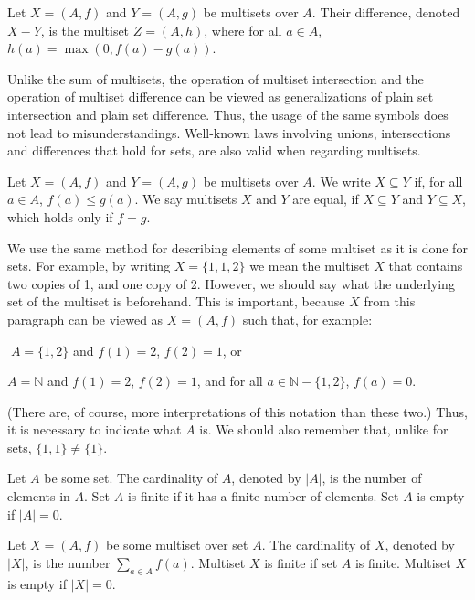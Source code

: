 \begin{definition}
    Let $X=(A,f)$ and $Y=(A,g)$ be multisets over $A$.
	Their difference, denoted $X-Y$\!, is the multiset $Z=(A,h)$, where for all $a\in A$, $h(a)=\max(0,f(a)-g(a))$.
\end{definition}

Unlike the sum of multisets, the operation of multiset intersection and the operation of multiset difference can be viewed as generalizations of plain set intersection and plain set difference.
Thus, the usage of the same symbols does not lead to misunderstandings.
Well-known laws involving unions, intersections and differences that hold for sets, are also valid when regarding multisets.

\begin{definition}
    Let $X=(A,f)$ and $Y=(A,g)$ be multisets over $A$.
	We write $X\subseteq Y$ if, for all $a\in A$, $f(a)\le g(a)$.
	We say multisets $X$ and $Y$ are equal, if $X\subseteq Y$ and $Y\subseteq X$, which holds only if $f=g$.
\end{definition}

We use the same method for describing elements of some multiset as it is done for sets.
For example, by writing $X=\{1,1,2\}$ we mean the multiset $X$ that contains two copies of 1, and one copy of 2.
However, we should say what the underlying set of the multiset is beforehand.
This is important, because $X$ from this paragraph can be viewed as $X=(A,f)$ such that, for example:
\begin{Enumerate}
	\renewcommand{\labelenumi}{(\roman{enumi})}
	\item $\;A=\{1,2\}$ and $f(1)=2$, $f(2)=1$, or
	\item $A=\mathbb{N}$ and $f(1)=2$, $f(2)=1$, and for all $a\in\mathbb{N}-\{1,2\}$, $f(a)=0$.
\end{Enumerate}
\vskip5pt
(There are, of course, more interpretations of this notation than these two.)
Thus, it is necessary to indicate what $A$ is.
We should also remember that, unlike for sets, $\{1,1\}\ne\{1\}$.

\begin{definition}
    Let $A$ be some set.
	The cardinality of $A$, denoted by $|A|$, is the number of elements in $A$.
	Set $A$ is finite if it has a finite number of elements.
	Set $A$ is empty if $|A|=0$.
\end{definition}

\begin{definition}
    Let $X=(A,f)$ be some multiset over set $A$.
	The cardinality of $X$, denoted by $|X|$, is the number $\sum_{a\in A}f(a)$.
	Multiset $X$ is finite if set $A$ is finite.
	Multiset $X$ is empty if $|X|=0$.
\end{definition}

